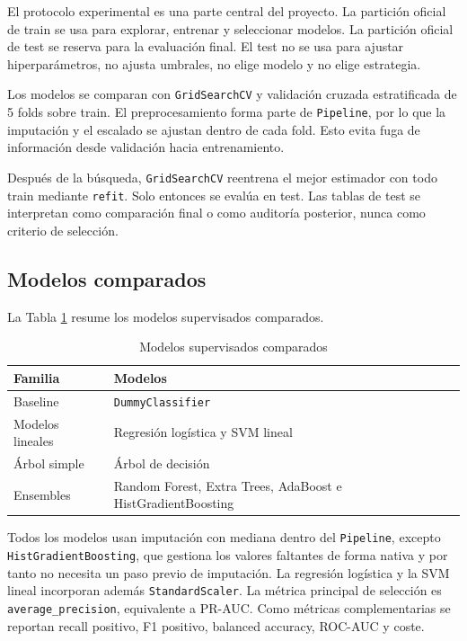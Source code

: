\documentclass[11pt,a4paper]{article}
\begin{document}
El protocolo experimental es una parte central del proyecto. La partición oficial de train se usa para explorar, entrenar y seleccionar modelos. La partición oficial de test se reserva para la evaluación final. El test no se usa para ajustar hiperparámetros, no ajusta umbrales, no elige modelo y no elige estrategia.

Los modelos se comparan con \texttt{GridSearchCV} y validación cruzada estratificada de 5 folds sobre train. El preprocesamiento forma parte de \texttt{Pipeline}, por lo que la imputación y el escalado se ajustan dentro de cada fold. Esto evita fuga de información desde validación hacia entrenamiento.

Después de la búsqueda, \texttt{GridSearchCV} reentrena el mejor estimador con todo train mediante \texttt{refit}. Solo entonces se evalúa en test. Las tablas de test se interpretan como comparación final o como auditoría posterior, nunca como criterio de selección.

\subsection{Modelos comparados}

La Tabla \ref{tab_modelos} resume los modelos supervisados comparados.

\begin{table}[H]
\centering
\caption{Modelos supervisados comparados}
\label{tab_modelos}
\small
\begin{tabular}{@{}lp{}@{}}
\toprule
\textbf{Familia} & \textbf{Modelos}\\
\midrule
Baseline & \texttt{DummyClassifier}\\
Modelos lineales & Regresión logística y SVM lineal\\
Árbol simple & Árbol de decisión\\
Ensembles & Random Forest, Extra Trees, AdaBoost e HistGradientBoosting\\
\bottomrule
\end{tabular}
\end{table}

Todos los modelos usan imputación con mediana dentro del \texttt{Pipeline}, excepto \texttt{HistGradientBoosting}, que gestiona los valores faltantes de forma nativa y por tanto no necesita un paso previo de imputación. La regresión logística y la SVM lineal incorporan además \texttt{StandardScaler}. La métrica principal de selección es \texttt{average\_precision}, equivalente a PR-AUC. Como métricas complementarias se reportan recall positivo, F1 positivo, balanced accuracy, ROC-AUC y coste.
\end{document}
